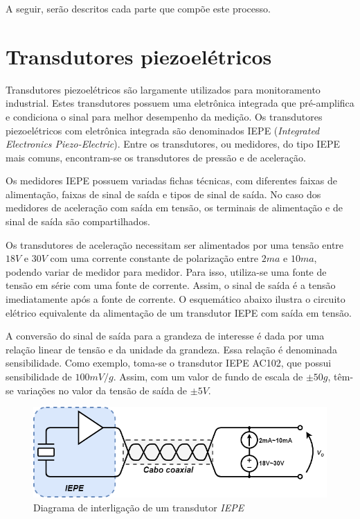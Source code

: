 \documentclass[
	12pt,				%
	openright,			%
	twoside,			%
	a4paper,			%
	english,			%
	french,				%
	spanish,			%
	brazil,				%
	]{abntex2}
\begin{document}
	A seguir, serão descritos cada parte que compõe este processo.

	\section{Transdutores piezoelétricos}
		Transdutores piezoelétricos são largamente utilizados para
		monitoramento industrial. Estes transdutores possuem uma eletrônica
		integrada que pré-amplifica e condiciona o sinal para melhor
		desempenho da medição. Os transdutores piezoelétricos com eletrônica
		integrada são denominados IEPE (\textit{Integrated Electronics
		Piezo-Electric}). Entre os transdutores, ou medidores, do tipo IEPE
		mais comuns, encontram-se os transdutores de pressão e de
		aceleração.

		Os medidores IEPE possuem variadas fichas técnicas, com diferentes
		faixas de alimentação, faixas de sinal de saída e tipos de sinal de
		saída. No caso dos medidores de aceleração com saída em tensão, os
		terminais de alimentação e de sinal de saída são compartilhados.

		Os transdutores de aceleração necessitam ser alimentados por uma
		tensão entre $18V$ e $30V$ com uma corrente constante de polarização
		entre $2ma$ e $10ma$, podendo variar de medidor para medidor. Para
		isso, utiliza-se uma fonte de tensão em série com uma fonte de
		corrente. Assim, o sinal de saída é a tensão imediatamente após a
		fonte de corrente. O esquemático abaixo ilustra o circuito elétrico
		equivalente da alimentação de um transdutor IEPE com saída em
		tensão.

		A conversão do sinal de saída para a grandeza de interesse é dada
		por uma relação linear de tensão e da unidade da grandeza. Essa
		relação é denominada sensibilidade. Como exemplo, toma-se o
		transdutor IEPE AC102, que possui sensibilidade de $100mV/g$.
		Assim, com um valor de fundo de escala de $\pm50g$, têm-se variações
		no valor da tensão de saída de $\pm5V$.\cite{ctc}
		\newpage

		\begin{figure}[H]
			\centering
			\includegraphics[width=\linewidth]{../Fotos/Diagramas/iepe.png}
			\caption{Diagrama de interligação de um transdutor \textit{IEPE}}
			\label{fig:ligacaoIEPE}
		\end{figure}
\end{document}
